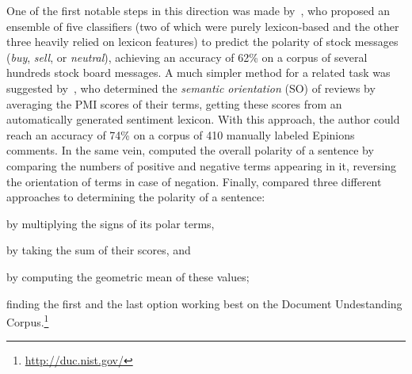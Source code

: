 One of the first notable steps in this direction was made
by~\citet{Das:01}, who proposed an ensemble of five classifiers (two
of which were purely lexicon-based and the other three heavily relied
on lexicon features) to predict the polarity of stock messages
(\emph{buy}, \emph{sell}, or \emph{neutral}), achieving an accuracy of
62\% on a corpus of several hundreds stock board messages.  A much
simpler method for a related task was suggested by~\citet{Turney:02},
who determined the \emph{semantic orientation} (SO) of reviews by
averaging the PMI scores of their terms, getting these scores from an
automatically generated sentiment lexicon.  With this approach, the
author could reach an accuracy of 74\% on a corpus of 410 manually
labeled Epinions comments.  In the same vein, \citet{Hu:04} computed
the overall polarity of a sentence by comparing the numbers of
positive and negative terms appearing in it, reversing the orientation
of terms in case of negation.  Finally, \citet{Kim:04} compared three
different approaches to determining the polarity of a sentence:
\begin{inparaenum}[(i)]
\item by multiplying the signs of its polar terms,
\item by taking the sum of their scores, and
\item by computing the geometric mean of these values;
\end{inparaenum}
finding the first and the last option working best on the Document
Undestanding Corpus.\footnote{\url{http://duc.nist.gov/}}



